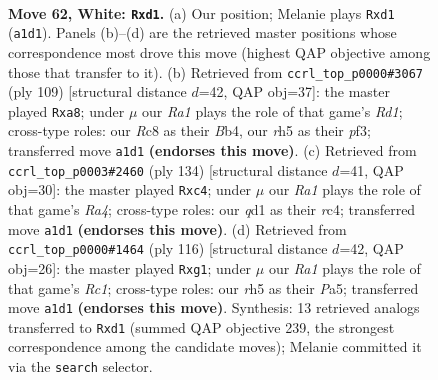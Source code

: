 \documentclass[11pt]{article}
\begin{document}
\clearpage

\begin{figure}[p]\centering
\begin{subfigure}{0.46\textwidth}\centering
\resizebox{\linewidth}{!}{%
\newchessgame
\chessboard[
  setfen={2R5/3r2k1/8/p6r/5K2/1P6/7P/R2q4 w - - 0 62},
  showmover=false,
  pgfstyle=straightmove, color=movearrow, markmove={a1-d1}
]}
\caption{}
\end{subfigure}\hfill
\begin{subfigure}{0.46\textwidth}\centering
\resizebox{\linewidth}{!}{%
\newchessgame
\chessboard[
  setfen={Q2r4/6k1/8/5p2/1b6/5P1K/R7/8 b - - 0 55},
  showmover=false,
  pgfstyle=straightmove, color=movearrow, markmove={d8-a8}
]}
\caption{}
\end{subfigure}
\\[4pt]
\begin{subfigure}{0.46\textwidth}\centering
\resizebox{\linewidth}{!}{%
\newchessgame
\chessboard[
  setfen={8/1kr4p/3R4/8/R1r3P1/6K1/8/8 w - - 19 68},
  showmover=false,
  pgfstyle=straightmove, color=movearrow, markmove={a4-c4}
]}
\caption{}
\end{subfigure}\hfill
\begin{subfigure}{0.46\textwidth}\centering
\resizebox{\linewidth}{!}{%
\newchessgame
\chessboard[
  setfen={8/8/8/P5rk/K7/8/8/2R3q1 w - - 0 59},
  showmover=false,
  pgfstyle=straightmove, color=movearrow, markmove={c1-g1}
]}
\caption{}
\end{subfigure}
\caption{\textbf{Move 62, White: \texttt{Rxd1}.} (a) Our position; Melanie plays \texttt{Rxd1} (\texttt{a1d1}). Panels (b)--(d) are the retrieved master positions whose correspondence most drove this move (highest QAP objective among those that transfer to it). (b) Retrieved from \texttt{ccrl\_top\_p0000\#3067} (ply 109) [structural distance $d$=42, QAP obj=37]: the master played \texttt{Rxa8}; under $\mu$ our \emph{Ra1} plays the role of that game's \emph{Rd1}; cross-type roles: our \emph{R}c8 as their \emph{B}b4, our \emph{r}h5 as their \emph{p}f3; transferred move \texttt{a1d1} \textbf{(endorses this move)}. (c) Retrieved from \texttt{ccrl\_top\_p0003\#2460} (ply 134) [structural distance $d$=41, QAP obj=30]: the master played \texttt{Rxc4}; under $\mu$ our \emph{Ra1} plays the role of that game's \emph{Ra4}; cross-type roles: our \emph{q}d1 as their \emph{r}c4; transferred move \texttt{a1d1} \textbf{(endorses this move)}. (d) Retrieved from \texttt{ccrl\_top\_p0000\#1464} (ply 116) [structural distance $d$=42, QAP obj=26]: the master played \texttt{Rxg1}; under $\mu$ our \emph{Ra1} plays the role of that game's \emph{Rc1}; cross-type roles: our \emph{r}h5 as their \emph{P}a5; transferred move \texttt{a1d1} \textbf{(endorses this move)}. Synthesis: 13 retrieved analogs transferred to \texttt{Rxd1} (summed QAP objective 239, the strongest correspondence among the candidate moves); Melanie committed it via the \texttt{search} selector.}
\label{fig:thought-m122}
\end{figure}
\end{document}

